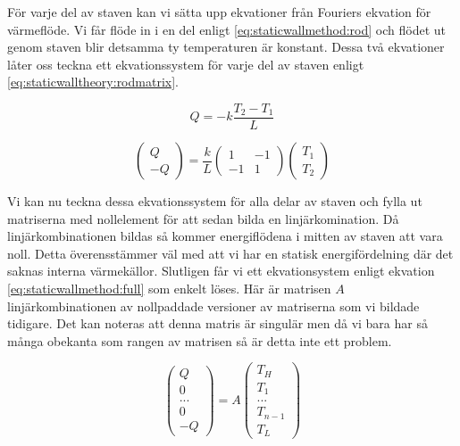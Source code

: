 För varje del av staven kan vi sätta upp ekvationer från Fouriers ekvation
för värmeflöde. Vi får flöde in i en del enligt \eqref{eq:staticwallmethod:rod} och
flödet ut genom staven blir detsamma ty temperaturen är konstant. Dessa två
ekvationer låter oss teckna ett ekvationssystem för varje del av staven
enligt \eqref{eq:staticwalltheory:rodmatrix}.

\begin{equation}
\label{eq:staticwallmethod:rod}
Q = -k\frac{T_{2}-T_{1}}{L}
\end{equation}


\begin{equation}
\label{eq:staticwalltheory:rodmatrix}
\begin{pmatrix}
Q \\
-Q
\end{pmatrix} = 
\frac{k}{L}\begin{pmatrix}
1 & -1 \\
-1 & 1
\end{pmatrix}
\begin{pmatrix}
T_1 \\
T_2
\end{pmatrix}
\end{equation}

\noindent
Vi kan nu teckna dessa ekvationssystem för alla delar av staven och fylla
ut matriserna med nollelement för att sedan bilda en linjärkomination.
Då linjärkombinationen bildas så kommer energiflödena i mitten av staven att
vara noll. Detta överensstämmer väl med att vi har en statisk energifördelning
där det saknas interna värmekällor.
Slutligen får vi ett ekvationsystem enligt ekvation
\eqref{eq:staticwallmethod:full} som enkelt löses. Här
är matrisen $A$ linjärkombinationen av nollpaddade versioner av
matriserna som vi bildade tidigare.
Det kan noteras att denna matris är singulär men då vi bara har så många
obekanta som rangen av matrisen så är detta inte ett problem.

\begin{equation}
\label{eq:staticwallmethod:full}
\begin{pmatrix}
Q\\0\\...\\0\\-Q
\end{pmatrix} = A
\begin{pmatrix}
T_H\\T_1\\...\\T_{n-1}\\T_L
\end{pmatrix}
\end{equation}
